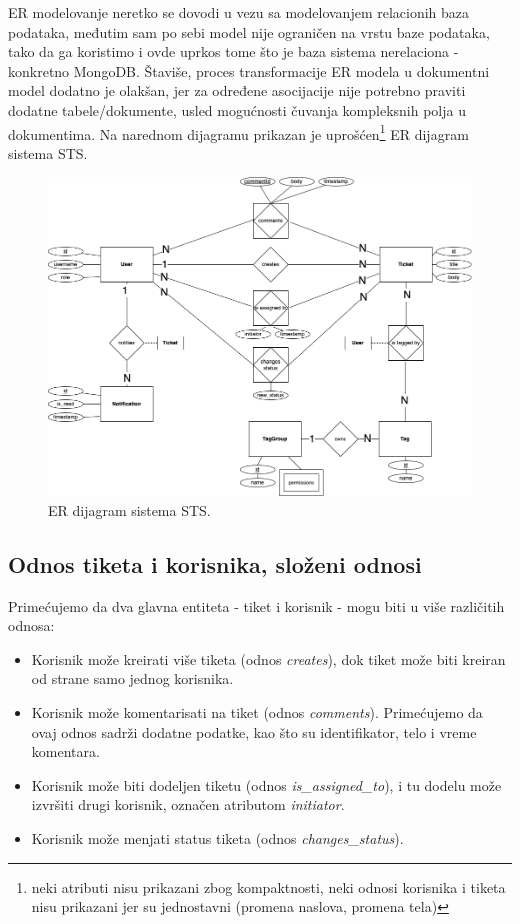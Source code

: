 \documentclass[12pt,oneside]{memoir}
\begin{document}
ER modelovanje neretko se dovodi u vezu sa modelovanjem relacionih baza podataka, međutim sam po sebi model nije ograničen na vrstu baze podataka, tako da ga koristimo i ovde uprkos tome što je baza sistema nerelaciona - konkretno MongoDB. Štaviše, proces transformacije ER modela u dokumentni model dodatno je olakšan, jer za određene asocijacije nije potrebno praviti dodatne tabele/dokumente, usled mogućnosti čuvanja kompleksnih polja u dokumentima. Na narednom dijagramu prikazan je uprošćen\footnote{neki atributi nisu prikazani zbog kompaktnosti, neki odnosi korisnika i tiketa nisu prikazani jer su jednostavni (promena naslova, promena tela)} ER dijagram sistema STS.

\begin{figure}[h]
  \centering
  \includegraphics[width=1\textwidth]{docs/images/ch_1/rdiagram.png} 
  \caption{ER dijagram sistema STS.}
\end{figure}

\newpage
\subsection{Odnos tiketa i korisnika, složeni odnosi}
Primećujemo da dva glavna entiteta - tiket i korisnik - mogu biti u više različitih odnosa:
\begin{itemize}
    \item Korisnik može kreirati više tiketa (odnos \textit{creates}), dok tiket može biti kreiran od strane samo jednog korisnika.
    \item Korisnik može komentarisati na tiket (odnos \textit{comments}). Primećujemo da ovaj odnos sadrži dodatne podatke, kao što su identifikator, telo i vreme komentara.
    \item Korisnik može biti dodeljen tiketu (odnos \textit{is\_assigned\_to}), i tu dodelu može izvršiti drugi korisnik, označen atributom \textit{initiator}.
    \item Korisnik može menjati status tiketa (odnos \textit{changes\_status}).
\end{itemize}
\end{document}
